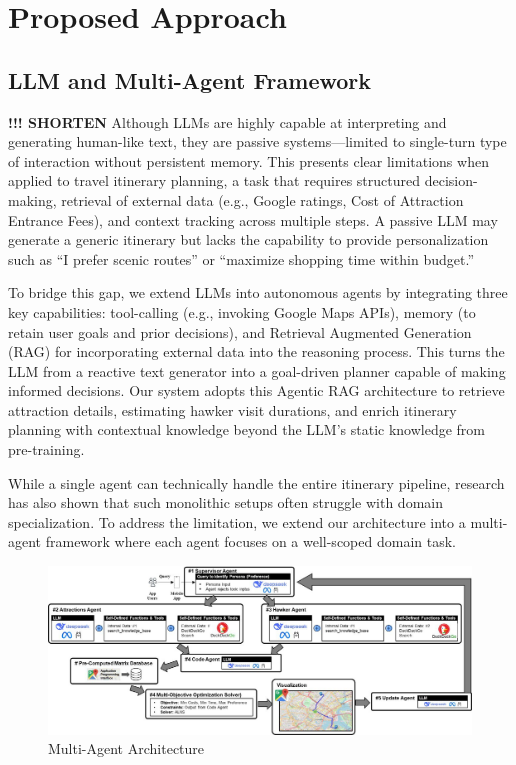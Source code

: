\documentclass{ecai}
\begin{document}
\section{Proposed Approach}
\subsection{LLM and Multi-Agent Framework}
\textbf{!!! SHORTEN} Although LLMs are highly capable at interpreting and generating human-like text, they are passive systems—limited to single-turn type of interaction without persistent memory. This presents clear limitations when applied to travel itinerary planning, a task that requires structured decision-making, retrieval of external data (e.g., Google ratings, Cost of Attraction Entrance Fees), and context tracking across multiple steps. A passive LLM may generate a generic itinerary but lacks the capability to provide personalization such as “I prefer scenic routes” or “maximize shopping time within budget.”

To bridge this gap, we extend LLMs into autonomous agents by integrating three key capabilities: tool-calling (e.g., invoking Google Maps APIs), memory (to retain user goals and prior decisions), and Retrieval Augmented Generation (RAG) for incorporating external data into the reasoning process. This turns the LLM from a reactive text generator into a goal-driven planner capable of making informed decisions. Our system adopts this Agentic RAG architecture to retrieve attraction details, estimating hawker visit durations, and enrich itinerary planning with contextual knowledge beyond the LLM’s static knowledge from pre-training.

While a single agent can technically handle the entire itinerary pipeline, research has also shown that such monolithic setups often struggle with domain specialization. To address the limitation, we extend our architecture into a multi-agent framework where each agent focuses on a well-scoped domain task.

\begin{figure}[h]
    \centering
    \includegraphics[width=1\linewidth]{6098288248590812104.jpg}
    \caption{Multi-Agent Architecture}
    \label{fig:Workflow Diagram}
\end{figure}
\end{document}
